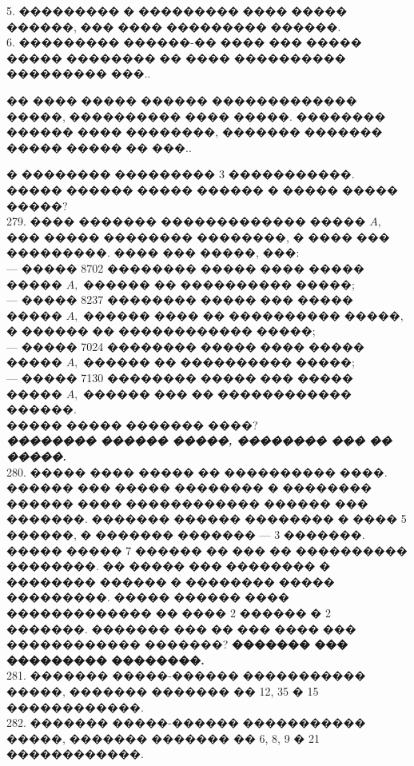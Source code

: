 \documentclass[12pt]{article}
\begin{document}
5. ��������� � ��������� ���� ����� ������, ��� ���� ��������� ������.\\
6. ��������� ������-�� ���� ��� ����� ����� �������� �� ���� ���������� ��������� ���.\newpage{}. \begin{center}
\begin{figure}[ht!]
\end{figure}
\end{center}
�� ���� ����� ������ ������������� �����, ���������� ���� �����. �������� ������ ���� ��������, ������� ������� ����� ����� �� ���.\newpage{}. \begin{center}
\begin{figure}[ht!]
\end{figure}
\end{center}
� �������� ��������� 3 �����������. ����� ������ ����� ������ � ����� ����� �����?\\
279. ���� ������� ������������� ����� $A,$ ��� ����� �������� ��������, � ���� ��� ���������. ���� ��� �����, ���:\\
 --- ����� 8702 �������� ����� ���� ����� ����� $A,$ ������ �� ���������� �����;\\
 --- ����� 8237 �������� ����� ��� ����� ����� $A,$ ������ ���� �� ���������� �����, � ������ �� ������������ �����;\\
 --- ����� 7024 �������� ����� ���� ����� ����� $A,$ ������ �� ���������� �����;\\
 --- ����� 7130 �������� ����� ��� ����� ����� $A,$ ������ ��� �� ������������ ������.\\
 ����� ����� ������� ����?\\
  {\it {\textbf {�������� ������ �����, �������� ��� �� �����.}}}\\
280. ����� ���� ����� �� ���������� ����. ������ ��� ����� �������� � �������� ������ ���� ������������ ������ ��� �������. ������� ������ �������� � ���� 5 ������, � ������� ������� --- 3 �������. ����� ����� 7 ������ �� ��� �� ���������� ��������. �� ����� ��� �������� � �������� ������ � �������� ����� ���������. ����� ������ ���� ������������� �� ���� 2 ������ � 2 �������. ������� ��� �� ��� ���� ��� ������������ �������? {\textbf {������� ��� ��������� ��������.}}\\
281. ������� �����-������ ����������� �����, ������� ������� �� 12, 35 � 15 ������������.\\
282. ������� �����-������ ����������� �����, ������� ������� �� 6, 8, 9 � 21 ������������.\\
\end{document}
